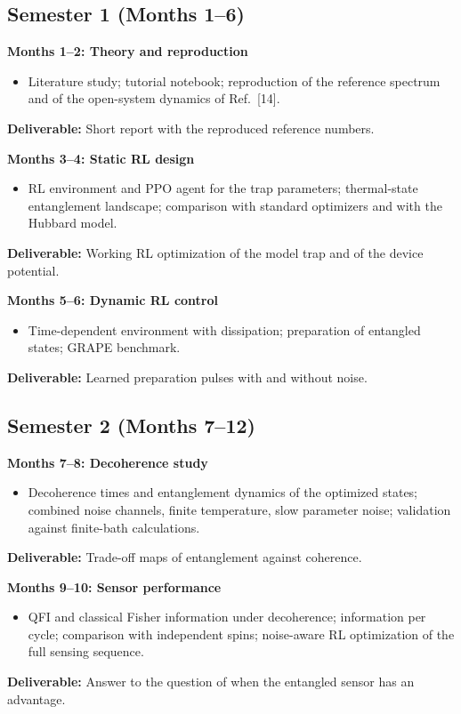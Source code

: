 \documentclass[12pt,a4paper]{article}
\begin{document}
\subsection*{Semester 1 (Months 1--6)}

\textbf{Months 1--2: Theory and reproduction}
\begin{itemize}
    \item Literature study; tutorial notebook; reproduction of the
    reference spectrum and of the open-system dynamics of Ref.~[14].
\end{itemize}
\textbf{Deliverable:} Short report with the reproduced reference numbers.

\bigskip

\textbf{Months 3--4: Static RL design}
\begin{itemize}
    \item RL environment and PPO agent for the trap parameters;
    thermal-state entanglement landscape; comparison with standard
    optimizers and with the Hubbard model.
\end{itemize}
\textbf{Deliverable:} Working RL optimization of the model trap and
of the device potential.

\bigskip

\textbf{Months 5--6: Dynamic RL control}
\begin{itemize}
    \item Time-dependent environment with dissipation; preparation of
    entangled states; GRAPE benchmark.
\end{itemize}
\textbf{Deliverable:} Learned preparation pulses with and without
noise.

\subsection*{Semester 2 (Months 7--12)}

\textbf{Months 7--8: Decoherence study}
\begin{itemize}
    \item Decoherence times and entanglement dynamics of the optimized
    states; combined noise channels, finite temperature, slow
    parameter noise; validation against finite-bath calculations.
\end{itemize}
\textbf{Deliverable:} Trade-off maps of entanglement against coherence.

\bigskip

\textbf{Months 9--10: Sensor performance}
\begin{itemize}
    \item QFI and classical Fisher information under decoherence;
    information per cycle; comparison with independent spins;
    noise-aware RL optimization of the full sensing sequence.
\end{itemize}
\textbf{Deliverable:} Answer to the question of when the entangled
sensor has an advantage.
\end{document}
